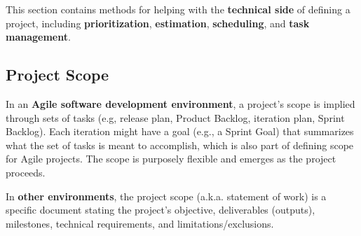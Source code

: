 This section contains methods for helping with the \textbf{technical side} of defining a project, including \textbf{prioritization}, \textbf{estimation}, \textbf{scheduling}, and \textbf{task management}.

\subsection{Project Scope}
In an \textbf{Agile software development environment}, a project's scope is implied through sets of tasks (e.g, release plan\marginpar{\releasePlanDef\margindivider}, Product Backlog\marginpar{\productBacklogDef\margindivider}, iteration plan\marginpar{\iterationPlanDef\margindivider}, Sprint Backlog\marginpar{\sprintBacklogDef\margindivider}). Each iteration might have a goal (e.g., a Sprint Goal) that summarizes what the set of tasks is meant to accomplish, which is also part of defining scope for Agile projects. The scope is purposely flexible and emerges as the project proceeds.

In \textbf{other environments}, the project scope (a.k.a. statement of work) is a specific document stating the project's objective, deliverables (outputs), milestones, technical requirements, and limitations/exclusions. 

